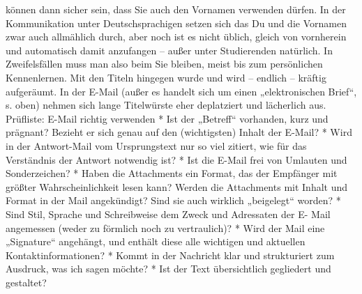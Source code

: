 \documentclass[]{book}
\theoremstyle{definition}
\theoremstyle{definition}
\theoremstyle{definition}
\theoremstyle{remark}
\begin{document}
können dann sicher sein, dass Sie auch den Vornamen verwenden dürfen. In
der Kommunikation unter Deutschsprachigen setzen sich das Du und die
Vornamen zwar auch allmählich durch, aber noch ist es nicht üblich,
gleich von vornherein und automatisch damit anzufangen -- außer unter
Studierenden natürlich. In Zweifelsfällen muss man also beim Sie
bleiben, meist bis zum persönlichen Kennenlernen. Mit den Titeln
hingegen wurde und wird -- endlich -- kräftig aufgeräumt. In der E-Mail
(außer es handelt sich um einen „elektronischen Brief``, s. oben) nehmen
sich lange Titelwürste eher deplatziert und lächerlich aus. Prüfliste:
E-Mail richtig verwenden * Ist der „Betreff`` vorhanden, kurz und
prägnant? Bezieht er sich genau auf den (wichtigsten) Inhalt der E-Mail?
* Wird in der Antwort-Mail vom Ursprungstext nur so viel zitiert, wie
für das Verständnis der Antwort notwendig ist? * Ist die E-Mail frei von
Umlauten und Sonderzeichen? * Haben die Attachments ein Format, das der
Empfänger mit größter Wahrscheinlichkeit lesen kann? Werden die
Attachments mit Inhalt und Format in der Mail angekündigt? Sind sie auch
wirklich „beigelegt`` worden? * Sind Stil, Sprache und Schreibweise dem
Zweck und Adressaten der E- Mail angemessen (weder zu förmlich noch zu
vertraulich)? * Wird der Mail eine „Signature`` angehängt, und enthält
diese alle wichtigen und aktuellen Kontaktinformationen? * Kommt in der
Nachricht klar und strukturiert zum Ausdruck, was ich sagen möchte? *
Ist der Text übersichtlich gegliedert und gestaltet?
\end{document}
